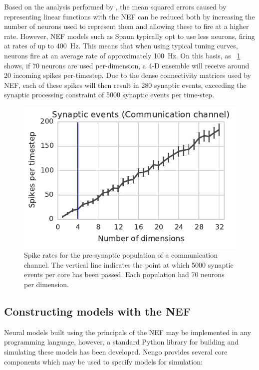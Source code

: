 \documentclass[conference]{IEEEtran}
\begin{document}
Based on the analysis performed by \textcite{Eliasmith2004}, the mean squared errors caused by representing linear functions with the NEF can be reduced both by increasing the number of neurons used to represent them and allowing these to fire at a higher rate. 
However, NEF models such as Spaun typically opt to use less neurons, firing at rates of up to \SI{400}{\hertz}. 
This means that when using typical tuning curves, neurons fire at an average rate of approximately \SI{100}{\hertz}. 
On this basis, as \figurename~\ref{fig:results/network-utilisation} shows, if 70 neurons are used per-dimension, a 4-D ensemble will receive around 20 incoming spikes  per-timestep.
Due to the dense connectivity matrices used by NEF, each of these spikes will then result in 280 synaptic events, exceeding the synaptic processing constraint of 5000 synaptic events per time-step.

  \begin{figure}[!t]
    \centering
    \includegraphics[scale=0.8]{figures/network-1}
    \caption{Spike rates for the pre-synaptic population of a communication channel.  The vertical line indicates the point at which \num{5000} synaptic events per core has been passed. Each population had 70 neurons per dimension.}
    \label{fig:results/network-utilisation}
  \end{figure}

  \subsection{Constructing models with the NEF}
\label{sef:background/constructing}
Neural models built using the principals of the NEF may be implemented in any programming language, however, a standard Python library for building and simulating these models has been developed. Nengo \parencite{Bekolay2014} provides several core components which may be used to specify models for simulation:
\end{document}

